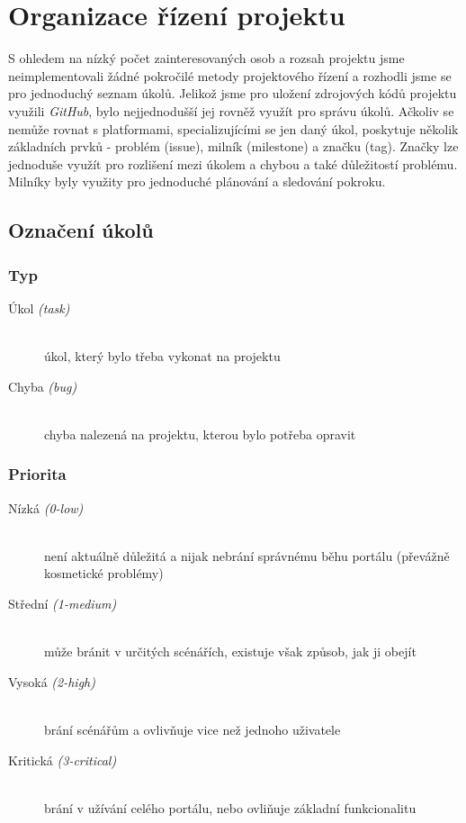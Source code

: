 \section{Organizace řízení projektu}
S ohledem na nízký počet zainteresovaných osob a rozsah projektu jsme neimplementovali žádné pokročilé metody projektového řízení a rozhodli jsme se pro jednoduchý seznam úkolů. Jelikož jsme pro uložení zdrojových kódů projektu využili \emph{GitHub}, bylo nejjednodušší jej rovněž využít pro správu úkolů. Ačkoliv se nemůže rovnat s platformami, specializujícími se jen daný úkol, poskytuje několik základních prvků - problém (issue), milník (milestone) a značku (tag). Značky lze jednoduše využít pro rozlišení mezi úkolem a chybou a také důležitostí problému. Milníky byly využity pro jednoduché plánování a sledování pokroku.

\subsection*{Označení úkolů}

\subsubsection*{Typ}
\begin{description}
  \item[Úkol \emph{(task)}] \hfill \\
    úkol, který bylo třeba vykonat na projektu
  \item[Chyba \emph{(bug)}] \hfill \\
    chyba nalezená na projektu, kterou bylo potřeba opravit
\end{description}

\subsubsection*{Priorita}
\begin{description}
	\item[Nízká \emph{(0-low)}] \hfill \\
	  není aktuálně důležitá a nijak nebrání správnému běhu portálu (převážně kosmetické problémy)
	\item[Střední \emph{(1-medium)}] \hfill \\
	  může bránit v určitých scénářích, existuje však způsob, jak ji obejít
	\item[Vysoká  \emph{(2-high)}] \hfill \\
	  brání scénářům a ovlivňuje vice než jednoho uživatele 
	\item[Kritická \emph{(3-critical)}] \hfill \\
	  brání v užívání celého portálu, nebo ovliňuje základní funkcionalitu
\end{description}

